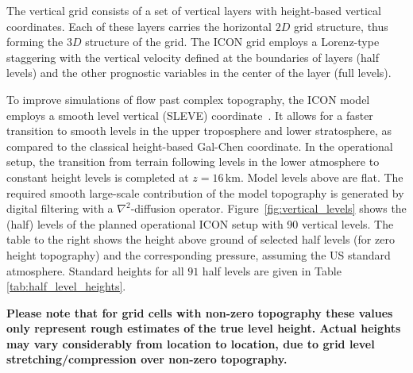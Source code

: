 The vertical grid consists of a set of vertical layers with height-based vertical coordinates.
Each of these layers carries the horizontal $2D$ grid structure, thus forming the $3D$ structure of the grid.
The ICON grid employs a Lorenz-type staggering with the vertical velocity defined at the boundaries of layers (half levels) 
and the other prognostic variables in the center of the layer (full levels).

To improve simulations of flow past complex topography, the ICON model employs a smooth level vertical (SLEVE) coordinate~\citep{Leuenberger2010}. 
It allows for a faster transition to smooth levels in the upper troposphere and lower stratosphere, as compared to the classical height-based Gal-Chen 
coordinate. In the operational setup, the transition from terrain following levels in the lower atmosphere to constant height levels is completed 
at $z=16\,\mathrm{km}$. Model levels above are flat. The required smooth large-scale contribution of the model topography is generated by 
digital filtering with a $\nabla^2$-diffusion operator. Figure~\ref{fig:vertical_levels} shows the (half) levels of the planned operational 
ICON setup with 90 vertical levels. The table to the right shows the height above ground of selected half levels (for zero height topography) 
and the corresponding pressure, assuming the US standard atmosphere. Standard heights for all $91$ half levels are given in Table 
\ref{tab:half_level_heights}.

\textbf{Please note that for grid cells with non-zero topography these values only represent rough estimates of the true level height. Actual heights may 
vary considerably from location to location, due to grid level stretching/compression over non-zero topography.}
  



